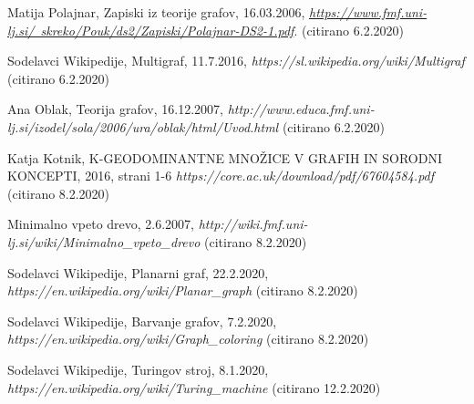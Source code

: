 \documentclass[11pt]{article}
\begin{document}
\begin{thebibliography}{9}
	
	\begin{flushleft} 
	 Matija Polajnar, Zapiski iz teorije grafov, 16.03.2006, 
	\href{https://www.fmf.uni-lj.si/~skreko/Pouk/ds2/Zapiski/Polajnar-DS2-1.pdf}{\textit{https://www.fmf.uni-lj.si/~skreko/Pouk/ds2/Zapiski/Polajnar-DS2-1.pdf}}. (citirano 6.2.2020)
	\end{flushleft}	
	
	\begin{flushleft}
	Sodelavci Wikipedije, Multigraf, 11.7.2016, \textit{https://sl.wikipedia.org/wiki/Multigraf} (citirano 6.2.2020)
	\end{flushleft}
	
	\begin{flushleft}
	Ana Oblak, Teorija grafov, 16.12.2007, 
	\textit{http://www.educa.fmf.uni-lj.si/izodel/sola/2006/ura/oblak/html/Uvod.html} (citirano 6.2.2020)	
	\end{flushleft}
	
	\begin{flushleft}
	Katja Kotnik, K-GEODOMINANTNE MNOŽICE V GRAFIH IN SORODNI KONCEPTI, 2016, strani 1-6
	\textit{https://core.ac.uk/download/pdf/67604584.pdf} (citirano 8.2.2020)
	\end{flushleft}	
	
	\begin{flushleft}
	Minimalno vpeto drevo, 2.6.2007, 
	\textit{http://wiki.fmf.uni-lj.si/wiki/Minimalno\_vpeto\_drevo} (citirano 8.2.2020)
	\end{flushleft}
	
	\begin{flushleft}
	Sodelavci Wikipedije, Planarni graf, 22.2.2020, 
	\textit{https://en.wikipedia.org/wiki/Planar\_graph} (citirano 8.2.2020)
	\end{flushleft}
	
	\begin{flushleft}
	Sodelavci Wikipedije, Barvanje grafov, 7.2.2020, 
	\textit{https://en.wikipedia.org/wiki/Graph\_coloring} (citirano 8.2.2020)
	\end{flushleft}	
	
	\begin{flushleft}
	Sodelavci Wikipedije, Turingov stroj, 8.1.2020, 
	\textit{https://en.wikipedia.org/wiki/Turing\_machine} (citirano 12.2.2020)
	\end{flushleft}	


\end{thebibliography}
\end{document}
